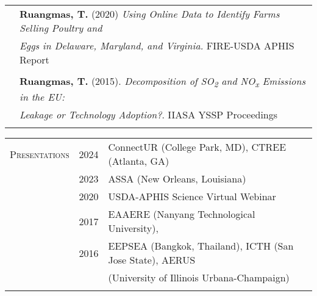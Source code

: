 \documentclass[letterpaper,11pt,oneside]{article}\usepackage[]{graphicx}\usepackage[]{xcolor}
\begin{document}
\begin{tabular}{p{1.2in} l}
                        & \textbf{Ruangmas, T.} (2020) \textit{Using Online Data to Identify Farms Selling Poultry and} \\
                        & \textit{Eggs in Delaware, Maryland, and Virginia.} FIRE-USDA APHIS Report \href{https://drive.google.com/file/d/1tEazLXx8xA6s9KPVHxVDIlz273T3Oy9N/view?usp=drive_link}{\color{blue}{[LINK]}}\\
                        & \\
                        & \textbf{Ruangmas, T.} (2015). \textit{Decomposition of SO\textsubscript{2} and NO\textsubscript{x} Emissions in the EU:}  \\
                        &  \textit{Leakage or Technology Adoption?}. IIASA YSSP Proceedings \\
                        & \\
\end{tabular}

\noindent \begin{tabular}{p{1.2in} p{0.9in} l}                          
\textsc{Presentations}  & 2024 & ConnectUR (College Park, MD), CTREE (Atlanta, GA) \\
                        & 2023 & ASSA (New Orleans, Louisiana) \\
                        & 2020 & USDA-APHIS Science Virtual Webinar\\
                        & 2017 & EAAERE (Nanyang Technological University), \\ 
                        & 2016 & EEPSEA (Bangkok, Thailand), ICTH (San Jose State), AERUS \\ 
                        & & (University of Illinois Urbana-Champaign) \\
                        & & \\
\end{tabular}
\end{document}
